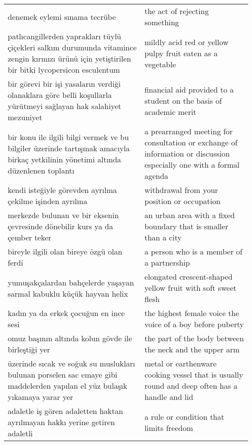 \begin{longtable}{p{} p{}}
    \cmidrule(rl){1-2}
    denemek eylemi sınama tecrübe & the act of rejecting something \\
    \cmidrule(rl){1-2}
    patlıcangillerden yaprakları tüylü çiçekleri salkım durumunda vitamince zengin kırmızı ürünü için yetiştirilen bir bitki lycopersicon esculentum & mildly acid red or yellow pulpy fruit eaten as a vegetable \\
    \cmidrule(rl){1-2}
    bir görevi bir işi yasaların verdiği olanaklara göre belli koşullarla yürütmeyi sağlayan hak salahiyet mezuniyet & financial aid provided to a student on the basis of academic merit \\
    \cmidrule(rl){1-2}
    bir konu ile ilgili bilgi vermek ve bu bilgiler üzerinde tartışmak amacıyla birkaç yetkilinin yönetimi altında düzenlenen toplantı & a prearranged meeting for consultation or exchange of information or discussion especially one with a formal agenda \\
    \cmidrule(rl){1-2}
    kendi isteğiyle görevden ayrılma çekilme işinden ayrılma & withdrawal from your position or occupation \\
    \cmidrule(rl){1-2}
    merkezde bulunan ve bir eksenin çevresinde dönebilir kurs ya da çember teker & an urban area with a fixed boundary that is smaller than a city \\
    \cmidrule(rl){1-2}
    bireyle ilgili olan bireye özgü olan ferdi & a person who is a member of a partnership \\
    \cmidrule(rl){1-2}
    yumuşakçalardan bahçelerde yaşayan sarmal kabuklu küçük hayvan helix & elongated crescent-shaped yellow fruit with soft sweet flesh \\
    \cmidrule(rl){1-2}
    kadın ya da  erkek çocuğun en ince sesi & the highest female voice the voice of a boy before puberty \\
    \cmidrule(rl){1-2}
    omuz başının altında kolun gövde ile birleştiği yer & the part of the body between the neck and the upper arm \\
    \cmidrule(rl){1-2}
    üzerinde sıcak ve soğuk su muslukları bulunan porselen sac emaye gibi maddelerden yapılan el yüz bulaşık yıkamaya yarar yer & metal or earthenware cooking vessel that is usually round and deep often has a handle and lid \\
    \cmidrule(rl){1-2}
    adaletle iş gören adaletten haktan ayrılmayan hakkı yerine getiren adaletli & a rule or condition that limits freedom \\

\end{longtable}
